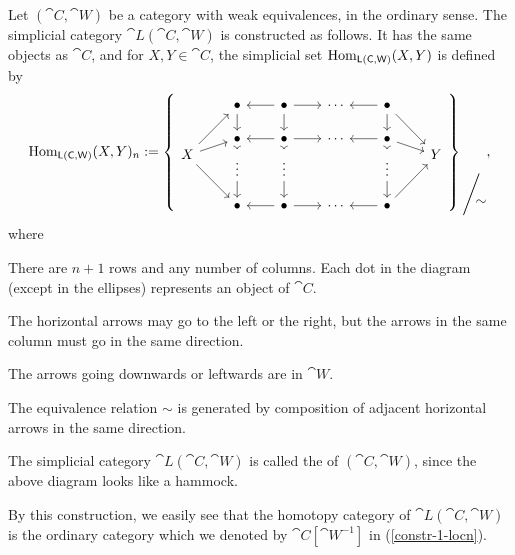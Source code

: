 \begin{construction}
    Let $(\cat{C},\cat{W})$ be a category with weak equivalences,
    in the ordinary sense.
    The simplicial category $\cat{L}(\cat{C},\cat{W})$ is constructed as follows.
    It has the same objects as $\cat{C}$, and for $X,Y\in\cat{C}$,
    the simplicial set $\operatorname{Hom}_{\mathsf{L}(\mathsf{C},\mathsf{W})}(X,Y)$ is defined by 
    \[ \Hom_{\cat{L}(\cat{C},\cat{W})}(X,Y)_n := \left\{
        \begin{tikzcd}[row sep={1.2em,between origins},column sep=2em]
            & \bullet\ar[dd] & \bullet\ar[l]\ar[r]\ar[dd] & \cdots & \bullet\ar[l]\ar[dd]\ar[dddr] \\\\
            & \bullet\ar[dd] & \bullet\ar[l]\ar[r]\ar[dd] & \cdots & \bullet\ar[l]\ar[dd]\ar[dr] \\
            X \ar[uuur]\ar[ur]\ar[dddr] &&&&& Y \\
            & \vdots\ar[dd] & \vdots\ar[dd] && \vdots\ar[dd] \\\\
            & \bullet & \bullet\ar[l]\ar[r] & \cdots & \bullet\ar[l]\ar[uuur]
        \end{tikzcd}
    \right\}\raisebox{-3em}{$\Bigg/$}\mkern-6mu\raisebox{-3.5em}{$\sim$}, \]
    where 
    \begin{itms}
        \item There are $n+1$ rows and any number of columns.
        Each dot in the diagram (except in the ellipses) represents an object of $\cat{C}$.
        \item The horizontal arrows may go to the left or the right,
        but the arrows in the same column must go in the same direction.
        \item The arrows going downwards or leftwards are in $\cat{W}$.
        \item The equivalence relation $\sim$ is generated by 
        composition of adjacent horizontal arrows in the same direction.
    \end{itms}
    The simplicial category $\cat{L}(\cat{C},\cat{W})$ is called the 
     of $(\cat{C},\cat{W})$,
    since the above diagram looks like a hammock. \varqed
\end{construction}

By this construction, we easily see that the homotopy category of $\cat{L}(\cat{C},\cat{W})$
is the ordinary category which we denoted by $\cat{C}[\cat{W}^{-1}]$ in (\ref{constr-1-locn}).

